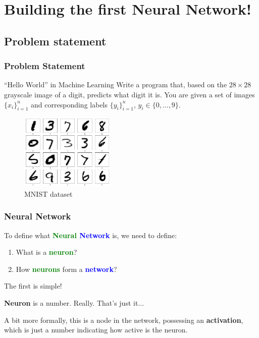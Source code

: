 \documentclass{beamer}
\begin{document}
    \section{Building the first Neural Network!}

    \subsection{Problem statement}
    
    \begin{frame}
        \frametitle{Problem Statement}

        \begin{block}{``Hello World'' in Machine Learning}
            Write a program that, based on the $28 \times 28$ grayscale image of a digit, predicts what digit it is. You are given a set of images $\{x_i\}_{i=1}^n$ and corresponding labels $\{y_i\}_{i=1}^n, \, y_i \in \{0,\dots,9\}$.
        \end{block}
        
        \begin{figure}
        \centering
            \includegraphics[width=0.4\textwidth]{images/presentation/mnist_2.png}
            \caption{MNIST dataset}
        \end{figure}
    \end{frame}

    \begin{frame}
        \frametitle{Neural Network}

        To define what \textbf{\textcolor{green}{Neural} \textcolor{blue}{Network}} is, we need to define:
        \begin{enumerate}
            \item What is a \textcolor{green}{\textbf{neuron}}?
            \item How \textcolor{green}{\textbf{neurons}} form a \textbf{\textcolor{blue}{network}}?
        \end{enumerate}

        The first is simple! 

        \begin{definition}
            \textbf{Neuron} is a number. Really. That's just it...

            A bit more formally, this is a node in the network, possessing an \textbf{activation}, which is just a number indicating how active is the neuron.
        \end{definition}
    \end{frame}
\end{document}
